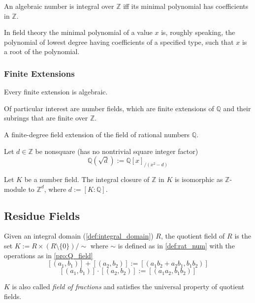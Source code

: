 \begin{proposition}
   An algebraic number is integral over \(\mathbb{Z}\) iff its minimal polynomial has coefficients in \(\mathbb{Z}\).
\end{proposition}
\begin{remark}
   In field theory the minimal polynomial of a value \(x\) is, roughly speaking, the polynomial of lowest degree having coefficients of a specified type, such that \(x\) is a root of the polynomial.
\end{remark}

\subsubsection{Finite Extensions}
Every finite extension is algebraic.

Of particular interest are number fields, which are finite extensions of \(\mathbb{Q}\) and their subrings that are finite over \(\mathbb{Z}\).
\begin{definition}
   A finite-degree field extension of the field of rational numbers \(\mathbb{Q}\).
\end{definition}
\begin{example}
   Let \(d \in \mathbb{Z}\) be nonsquare (has no nontrivial square integer factor)
   \[\mathbb{Q}(\sqrt{d}) := \mathbb{Q}[x]_{/(x^2 -d)}\]
\end{example}

\begin{proposition}
   Let \(K\) be a number field. The integral closure of \(\mathbb{Z}\) in \(K\) is isomorphic as \(\mathbb{Z}\)-module to \(\mathbb{Z}^d\), where \(d := [K:\mathbb{Q}]\).
\end{proposition}

\subsection{Residue Fields}
\begin{definition}
   Given an integral domain (\ref{def:integral_domain}) \(R\), the quotient field of \(R\) is the set \(K := R \times (R \setminus \{0\})/\sim\) where \(\sim\) is defined as in \cref{def:rat_num}
   with the operations as in \cref{pro:Q_field}
   \[[(a_1, b_1)] + [(a_2, b_2)] := [(a_1b_2 + a_2b_1, b_1b_2)]\]
   \[[(a_1, b_1)] \cdot [(a_2, b_2)] := [(a_1a_2, b_1b_2)]\]
\end{definition}
\begin{remark}
   \(K\) is also called \emph{field of fractions} and satisfies the universal property of quotient fields.
\end{remark}

